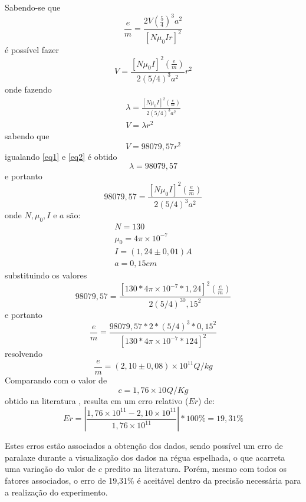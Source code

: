 Sabendo-se que
\begin{equation}
	\frac{e}{m}=\frac{2V\left(\frac{5}{4}\right)^3a^2}{[N\mu _0 Ir]^2}
\end{equation}
é possível fazer
\begin{equation}
	V = \frac{[N \mu _0 I]^2\left(\frac{e}{m}\right)}{2(5/4)^3a^2}r^2
\end{equation}
onde fazendo
\begin{equation}
\begin{split}
	\lambda = \frac{[N \mu _0 I]^2\left(\frac{e}{m}\right)}{2(5/4)^3a^2}\\
	V = \lambda r^2
\label{eq1}
\end{split}
\end{equation}
sabendo que
\begin{equation}
	V = 98079,57r^2
\label{eq2}
\end{equation}
igualando \ref{eq1} e \ref{eq2} é obtido
\begin{equation*}
	\lambda = 98079,57
\end{equation*}
e portanto
\begin{equation}
	98079,57 =  \frac{[N \mu _0 I]^2\left(\frac{e}{m}\right)}{2(5/4)^3a^2}
\end{equation}
onde $N,\mu _0,I$ e $a$ são:
\begin{equation*}
	\begin{split}
		N=130\\
		\mu _0 =4\pi\times10^{-7}\\
		I=(1,24\pm0,01)A\\
		a=0,15cm
	\end{split}
\end{equation*}
substituindo os valores
\begin{equation}
	98079,57 =  \frac{[130*4\pi\times10^{-7}*1,24]^2\left(\frac{e}{m}\right)}{2(5/4)^30,15^2}
\end{equation}
e portanto
\begin{equation}
	\frac{e}{m}=\frac{98079,57*2*(5/4)^3*0,15^2}{[130*4\pi\times10^{-7}*124]^2}
\end{equation}
resolvendo
\begin{equation}
	\frac{e}{m}=(2,10\pm0,08)\times10^{11}Q/kg
\end{equation}
Comparando com o valor de 
\begin{equation}
	c=1,76\times10^{} Q/Kg
\end{equation}        
obtido na literatura \cite{PASCO}, resulta em um erro relativo ($Er$) de:
\begin{equation}
	Er=\left|\frac{1,76\times10^{11}-2,10\times10^{11}}{1,76\times10^{11}}\right|*100\%= 19,31\%
\end{equation}

Estes erros estão associados a obtenção dos dados, sendo
possível um erro de paralaxe durante a visualização dos dados na régua espelhada, o que acarreta uma variação do valor de $c$ predito na literatura. Porém, mesmo com todos os fatores associados, o erro  de
19,31\% é aceitável dentro da precisão necessária para a realização do experimento.

